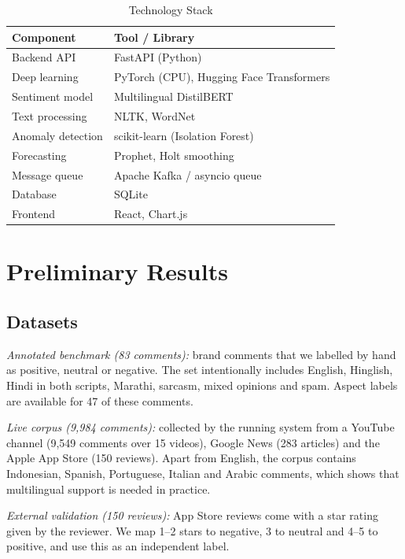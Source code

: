 \documentclass[conference]{IEEEtran}
\begin{document}
\begin{table}[t]
\caption{Technology Stack}
\label{tab:stack}
\centering
\footnotesize
\begin{tabular}{l l}
\toprule
\textbf{Component} & \textbf{Tool / Library} \\
\midrule
Backend API & FastAPI (Python) \\
Deep learning & PyTorch (CPU), Hugging Face Transformers \\
Sentiment model & Multilingual DistilBERT \\
Text processing & NLTK, WordNet \\
Anomaly detection & scikit-learn (Isolation Forest) \\
Forecasting & Prophet, Holt smoothing \\
Message queue & Apache Kafka / asyncio queue \\
Database & SQLite \\
Frontend & React, Chart.js \\
\bottomrule
\end{tabular}
\end{table}

\section{Preliminary Results}

\subsection{Datasets}
\textit{Annotated benchmark (83 comments):} brand comments that we labelled by hand as positive,
neutral or negative. The set intentionally includes English, Hinglish, Hindi in both scripts,
Marathi, sarcasm, mixed opinions and spam. Aspect labels are available for 47 of these comments.

\textit{Live corpus (9,984 comments):} collected by the running system from a YouTube channel (9,549
comments over 15 videos), Google News (283 articles) and the Apple App Store (150 reviews). Apart
from English, the corpus contains Indonesian, Spanish, Portuguese, Italian and Arabic comments, which
shows that multilingual support is needed in practice.

\textit{External validation (150 reviews):} App Store reviews come with a star rating given by the
reviewer. We map 1--2 stars to negative, 3 to neutral and 4--5 to positive, and use this as an
independent label.
\end{document}
